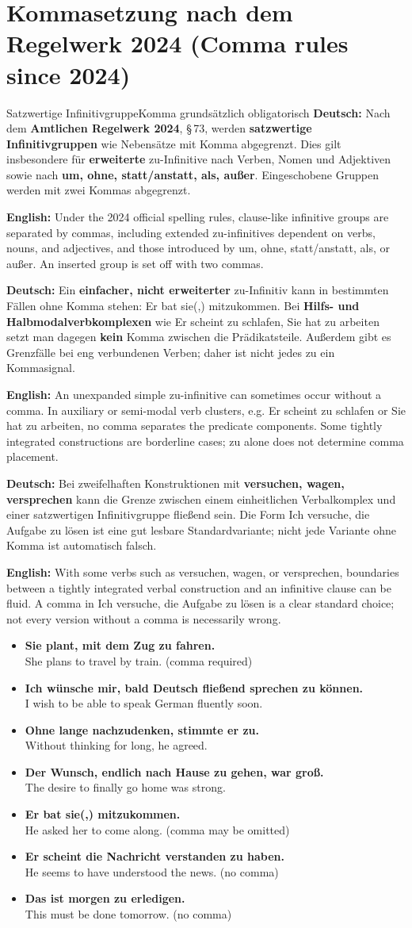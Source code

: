 \documentclass[a4paper,11pt]{article}
\newcommand{\GermanText}[1]{\textbf{Deutsch: }#1\par}
\newcommand{\EnglishText}[1]{{\small\color{SoftGray}\textbf{English: }#1\par}}
\newcommand{\ExampleItem}[2]{\item \textbf{#1}\\{\small\color{SoftGray}#2}}
\newcommand{\DEEN}[2]{\GermanText{#1}\EnglishText{#2}}
\newcommand{\Pair}[2]{\ExampleItem{#1}{#2}}
\begin{document}
\section{Kommasetzung nach dem Regelwerk 2024 \textnormal{(Comma rules since 2024)}}
\begin{grammarentry}{Satzwertige Infinitivgruppe}{Komma grundsätzlich obligatorisch}
\DEEN{Nach dem \textbf{Amtlichen Regelwerk 2024}, §\,73, werden \textbf{satzwertige Infinitivgruppen} wie Nebensätze mit Komma abgegrenzt. Dies gilt insbesondere für \textbf{erweiterte} zu-Infinitive nach Verben, Nomen und Adjektiven sowie nach \textbf{um, ohne, statt/anstatt, als, außer}. Eingeschobene Gruppen werden mit zwei Kommas abgegrenzt.}{Under the 2024 official spelling rules, clause-like infinitive groups are separated by commas, including extended zu-infinitives dependent on verbs, nouns, and adjectives, and those introduced by um, ohne, statt/anstatt, als, or außer. An inserted group is set off with two commas.}
\DEEN{Ein \textbf{einfacher, nicht erweiterter} zu-Infinitiv kann in bestimmten Fällen ohne Komma stehen: \glqq Er bat sie(,) mitzukommen.\grqq{} Bei \textbf{Hilfs- und Halbmodalverbkomplexen} wie \glqq Er scheint zu schlafen\grqq, \glqq Sie hat zu arbeiten\grqq{} setzt man dagegen \textbf{kein} Komma zwischen die Prädikatsteile. Außerdem gibt es Grenzfälle bei eng verbundenen Verben; daher ist nicht jedes zu ein Kommasignal.}{An unexpanded simple zu-infinitive can sometimes occur without a comma. In auxiliary or semi-modal verb clusters, e.g. Er scheint zu schlafen or Sie hat zu arbeiten, no comma separates the predicate components. Some tightly integrated constructions are borderline cases; zu alone does not determine comma placement.}
\DEEN{Bei zweifelhaften Konstruktionen mit \textbf{versuchen, wagen, versprechen} kann die Grenze zwischen einem einheitlichen Verbalkomplex und einer satzwertigen Infinitivgruppe fließend sein. Die Form \glqq Ich versuche, die Aufgabe zu lösen\grqq{} ist eine gut lesbare Standardvariante; nicht jede Variante ohne Komma ist automatisch falsch.}{With some verbs such as versuchen, wagen, or versprechen, boundaries between a tightly integrated verbal construction and an infinitive clause can be fluid. A comma in Ich versuche, die Aufgabe zu lösen is a clear standard choice; not every version without a comma is necessarily wrong.}
\end{grammarentry}
\begin{exbox}\begin{itemize}
\Pair{Sie plant, mit dem Zug zu fahren.}{She plans to travel by train. (comma required)}
\Pair{Ich wünsche mir, bald Deutsch fließend sprechen zu können.}{I wish to be able to speak German fluently soon.}
\Pair{Ohne lange nachzudenken, stimmte er zu.}{Without thinking for long, he agreed.}
\Pair{Der Wunsch, endlich nach Hause zu gehen, war groß.}{The desire to finally go home was strong.}
\Pair{Er bat sie(,) mitzukommen.}{He asked her to come along. (comma may be omitted)}
\Pair{Er scheint die Nachricht verstanden zu haben.}{He seems to have understood the news. (no comma)}
\Pair{Das ist morgen zu erledigen.}{This must be done tomorrow. (no comma)}
\end{itemize}\end{exbox}
\end{document}
